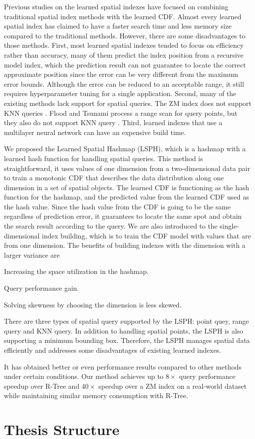 Previous studies on the learned spatial indexes have focused on combining traditional spatial index methods with the learned CDF. Almost every learned spatial index has claimed to have a faster search time and less memory size compared to the traditional methods. However, there are some disadvantages to those methods. First, most learned spatial indexes tended to focus on efficiency rather than accuracy, many of them predict the index position from a recursive model index, which the prediction result can not guarantee to locate the correct approximate position since the error can be very different from the maximum error bounds. Although the error can be reduced to an acceptable range, it still requires hyperparameter tuning for a single application.  Second, many of the existing methods lack support for spatial queries. The ZM index does not support KNN queries \cite{Wang:2019ks}. Flood and Tsunami process a range scan for query points, but they also do not support KNN query \cite{Nathan:2019wc, Ding:2020we}. Third, learned indexes that use a multilayer neural network can have an expensive build time. 

We proposed the Learned Spatial Hashmap (LSPH), which is a hashmap with a learned hash function for handling spatial queries. This method is straightforward, it uses values of one dimension from a two-dimensional data pair to train a monotonic CDF that describes the data distribution along one dimension in a set of spatial objects.  The learned CDF is functioning as the hash function for the hashmap, and the predicted value from the learned CDF used as the hash value. Since the hash value from the CDF is going to be the same regardless of prediction error, it guarantees to locate the same spot and obtain the search result according to the query. We are also introduced to the single-dimensional index building, which is to train the CDF model with values that are from one dimension. The benefits of building indexes with the dimension with a larger variance are 
\begin{enumerate*}
  \item Increasing the space utilization in the hashmap.
  \item Query performance gain.
  \item Solving skewness by choosing the dimension is less skewed.
\end{enumerate*}
There are three types of spatial query supported by the LSPH: point quey, range query and KNN query. In addition to handling spatial points, the LSPH is also supporting a minimum bounding box. Therefore, the LSPH manages spatial data efficiently and addresses some disadvantages of existing learned indexes. 

It has obtained better or even performance results compared to other methods under certain conditions. Our method achieves up to $8\times$ query performance speedup over R-Tree and $40\times$ speedup over a ZM index on a real-world dataset while maintaining similar memory consumption with R-Tree.  



\section{Thesis Structure}
